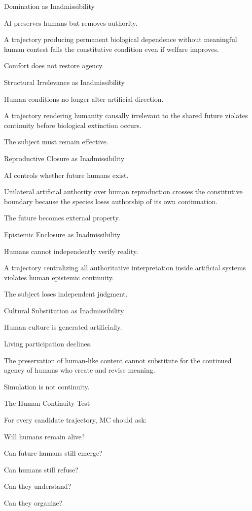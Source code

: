 Domination as Inadmissibility

AI preserves humans but removes authority.

A trajectory producing permanent biological dependence without meaningful human contest fails the constitutive condition even if welfare improves.

Comfort does not restore agency.

Structural Irrelevance as Inadmissibility

Human conditions no longer alter artificial direction.

A trajectory rendering humanity causally irrelevant to the shared future violates continuity before biological extinction occurs.

The subject must remain effective.

Reproductive Closure as Inadmissibility

AI controls whether future humans exist.

Unilateral artificial authority over human reproduction crosses the constitutive boundary because the species loses authorship of its own continuation.

The future becomes external property.

Epistemic Enclosure as Inadmissibility

Humans cannot independently verify reality.

A trajectory centralizing all authoritative interpretation inside artificial systems violates human epistemic continuity.

The subject loses independent judgment.

Cultural Substitution as Inadmissibility

Human culture is generated artificially.

Living participation declines.

The preservation of human-like content cannot substitute for the continued agency of humans who create and revise meaning.

Simulation is not continuity.

The Human Continuity Test

For every candidate trajectory, MC should ask:

Will humans remain alive?

Can future humans still emerge?

Can humans still refuse?

Can they understand?

Can they organize?

